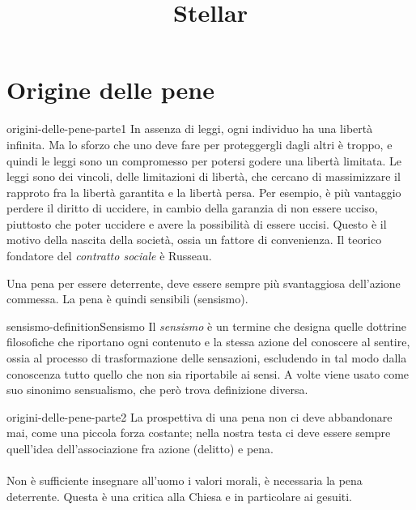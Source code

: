 \documentclass[preview]{standalone}
\begin{document}
\title{Stellar}
\genpage

\section{Origine delle pene}

\begin{snippet}{origini-delle-pene-parte1}
    In assenza di leggi, ogni individuo ha una libertà infinita. Ma lo sforzo che uno deve fare
    per proteggergli dagli altri è troppo, e quindi le leggi sono un compromesso per potersi godere una libertà
    limitata. Le leggi sono dei vincoli, delle limitazioni di libertà, che cercano di massimizzare
    il rapproto fra la libertà garantita e la libertà persa.
    Per esempio, è più vantaggio perdere il diritto di uccidere, in cambio della garanzia
    di non essere ucciso, piuttosto che poter uccidere e avere la possibilità di essere uccisi.
    Questo è il motivo della nascita della società, ossia un fattore di convenienza.
    Il teorico fondatore del \textit{contratto sociale} è Russeau.
    
    Una pena per essere deterrente, deve essere sempre più svantaggiosa dell'azione commessa.
    La pena è quindi sensibili (sensismo).
\end{snippet}

\begin{snippetdefinition}{sensismo-definition}{Sensismo}
    Il \textit{sensismo} è un termine che designa quelle
    dottrine filosofiche che riportano ogni contenuto e la stessa azione del
    conoscere al sentire, ossia al processo di trasformazione delle sensazioni,
    escludendo in tal modo dalla conoscenza tutto quello che non sia riportabile ai sensi.
    A volte viene usato come suo sinonimo sensualismo, che però trova definizione diversa.
\end{snippetdefinition}

\begin{snippet}{origini-delle-pene-parte2}
    La prospettiva di una pena non ci deve abbandonare mai, come una piccola forza costante;
    nella nostra testa ci deve essere sempre quell'idea dell'associazione fra azione (delitto) e pena.
    \\\\
    Non è sufficiente insegnare all'uomo i valori morali, è necessaria la pena deterrente.
    Questa è una critica alla Chiesa e in particolare ai gesuiti. 
\end{snippet}
\end{document}
